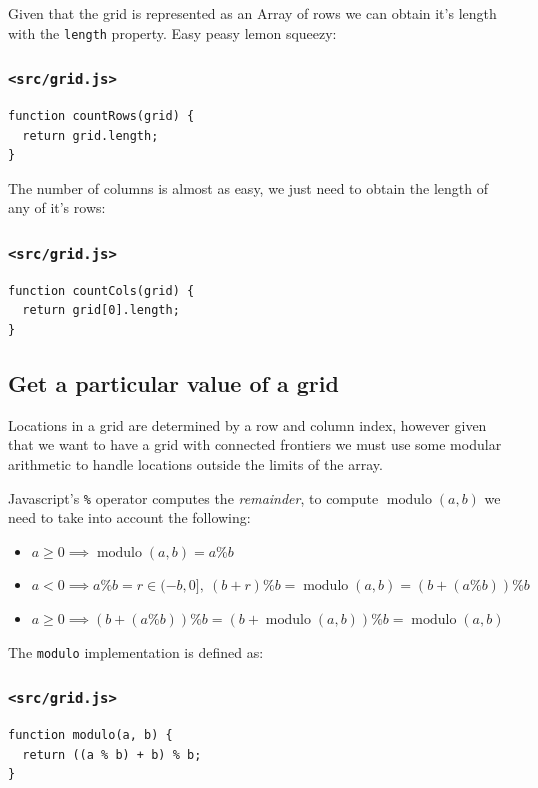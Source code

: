 \documentclass[11pt]{article}
\DeclareMathOperator{\modulo}{modulo}
\begin{document}
Given that the grid is represented as an Array of rows we can obtain it's length with the \texttt{length} property. Easy peasy lemon squeezy:

\subsubsection*{\texttt{<src/grid.js>}}
\label{sec:orgb64652c}
\begin{verbatim}
function countRows(grid) {
  return grid.length;
}
\end{verbatim}

The number of columns is almost as easy, we just need to obtain the length of any of it's rows:

\subsubsection*{\texttt{<src/grid.js>}}
\label{sec:org326bd2b}
\begin{verbatim}
function countCols(grid) {
  return grid[0].length;
}
\end{verbatim}

\subsection{Get a particular value of a grid}
\label{sec:orgb1425ed}

Locations in a grid are determined by a row and column index, however given that we want to have a grid with connected frontiers we must use some modular arithmetic to handle locations outside the limits of the array.

Javascript's \texttt{\%} operator computes the \emph{remainder}, to compute \(\modulo(a,b)\) we need to take into account the following:
\begin{itemize}
\item \(a \geq 0 \implies \modulo(a,b) = a \% b\)
\item \(a < 0 \implies a \% b = r \in (-b,0],\ (b+r)\%b = \modulo(a,b) = (b + (a \% b)) \% b\)
\item \(a \geq 0 \implies (b + (a \% b)) \% b = (b + \modulo(a,b)) \% b = \modulo(a,b)\)
\end{itemize}

The \texttt{modulo} implementation is defined as:

\subsubsection*{\texttt{<src/grid.js>}}
\label{sec:org12c3d7a}
\begin{verbatim}
function modulo(a, b) {
  return ((a % b) + b) % b;
}
\end{verbatim}
\end{document}
